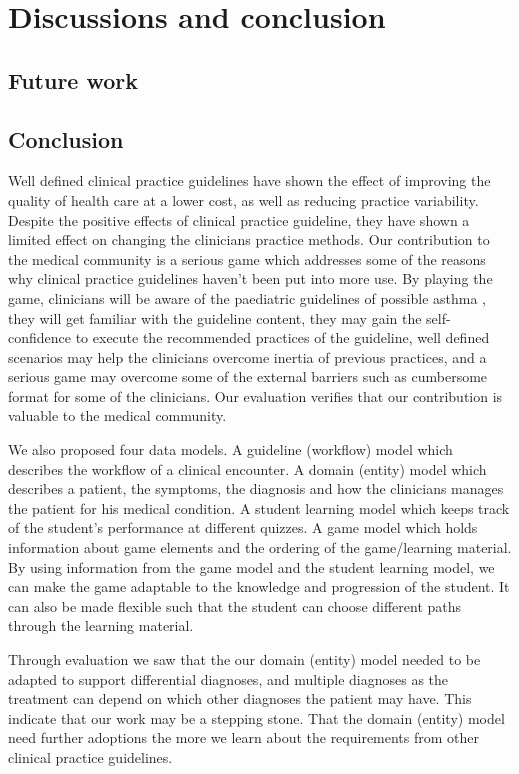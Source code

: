 \documentclass[a4paper,12pt,oneside]{book}
\begin{document}
\chapter{Discussions and conclusion}
\section{Future work}

\section{Conclusion}
Well defined clinical practice guidelines have shown the effect of improving the quality of health care at a lower cost, as well as reducing practice variability. Despite the positive effects of clinical practice guideline, they have shown a limited effect on changing the clinicians practice methods. Our contribution to the medical community is a serious game which addresses some of the reasons why clinical practice guidelines haven't been put into more use. By playing the game, clinicians will be aware of the paediatric guidelines of possible asthma \parencite{RepublicofKeny2016}, they will get familiar with the guideline content, they may gain the self-confidence to execute the recommended practices of the guideline, well defined scenarios may help the clinicians overcome inertia of previous practices, and a serious game may overcome some of the external barriers such as cumbersome format for some of the clinicians. Our evaluation verifies that our contribution is valuable to the medical community.

We also proposed four data models. A guideline (workflow) model which describes the workflow of a clinical encounter. A domain (entity) model which describes a patient, the symptoms, the diagnosis and how the clinicians manages the patient for his medical condition. A student learning model which keeps track of the student's performance at different quizzes. A game model which holds information about game elements and the ordering of the game/learning material. By using information from the game model and the student learning model, we can make the game adaptable to the knowledge and progression of the student. It can also be made flexible such that the student can choose different paths through the learning material.

Through evaluation we saw that the our domain (entity) model needed to be adapted to support differential diagnoses, and multiple diagnoses as the treatment can depend on which other diagnoses the patient may have. This indicate that our work may be a stepping stone. That the domain (entity) model need further adoptions the more we learn about the requirements from other clinical practice guidelines. 
\end{document}
